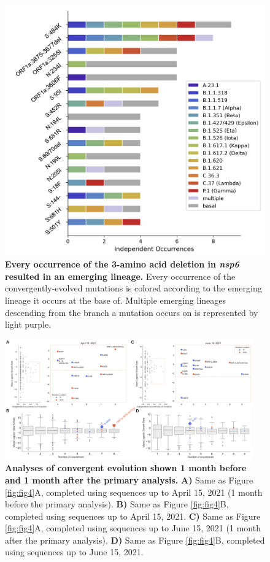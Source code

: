 \documentclass[12pt, letterpaper]{article}
\begin{document}
\begin{figure}[h!]
	\centerline{\includegraphics[scale=0.55]{fig4_supp1.png}}
	\caption{\textbf{Every occurrence of the 3-amino acid deletion in \emph{nsp6} resulted in an emerging lineage.}
	Every occurrence of the convergently-evolved mutations is colored according to the emerging lineage it occurs at the base of. Multiple emerging lineages descending from the branch a mutation occurs on is represented by light purple.
	}
	\label{fig:fig4_supp1}
\end{figure}

\begin{figure}[h!]
	\centerline{\includegraphics[width=0.95\textwidth]{fig4_supp2.png}}
	\caption{\textbf{Analyses of convergent evolution shown 1 month before and 1 month after the primary analysis.}
	\textbf{A)} Same as Figure \ref{fig:fig4}A, completed using sequences up to April 15, 2021 (1 month before the primary analysis). \textbf{B)} Same as Figure \ref{fig:fig4}B, completed using sequences up to April 15, 2021. \textbf{C)} Same as Figure \ref{fig:fig4}A, completed using sequences up to June 15, 2021 (1 month after the primary analysis). \textbf{D)} Same as Figure \ref{fig:fig4}B, completed using sequences up to June 15, 2021.
	}
	\label{fig:fig4_supp2}
\end{figure}
\end{document}
